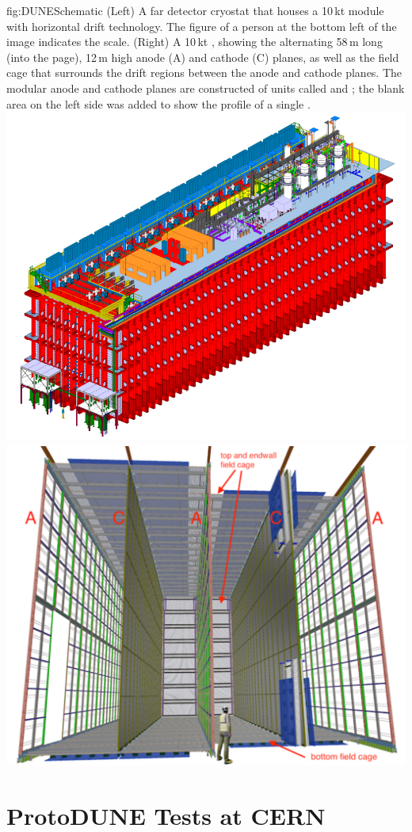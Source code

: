 \documentclass[../main-v1.tex]{subfiles}
\begin{document}
\begin{dunefigure}
{fig:DUNESchematic} %
{(Left) A far detector cryostat that houses a 10\,kt  module with horizontal drift technology. The figure of a person at the bottom left of the image indicates the scale.  (Right) A 10\,kt    , showing the alternating 58\,m long (into the page), 12\,m high anode (A) and cathode (C) planes, as well as the field cage that surrounds the drift regions between the anode and cathode planes. The modular anode and cathode planes are constructed of units called  and ; the blank area on the left side was added to show the profile of a single .}
\includegraphics[height=0.35\textwidth]{graphics/IntroFigures/Fig_03a_cryostat-scale.png}
\includegraphics[height=0.35\textwidth]{graphics/IntroFigures/Fig_03b_DUNESchematic.pdf}
\end{dunefigure}


\section{ProtoDUNE Tests at CERN  %
}
\end{document}
